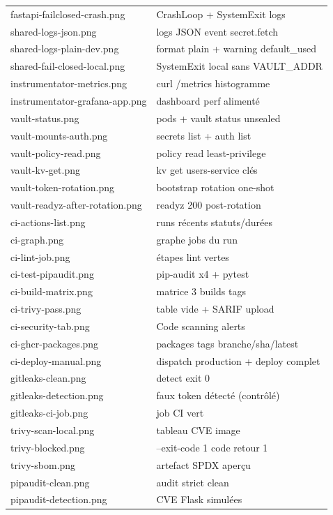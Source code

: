 \documentclass[12pt,a4paper]{article}
\begin{document}
{\begin{longtable}{@{}p{5.6cm}p{9.4cm}@{}}
fastapi-failclosed-crash.png & CrashLoop + SystemExit logs \\
shared-logs-json.png & logs JSON event secret.fetch \\
shared-logs-plain-dev.png & format plain + warning default\_used \\
shared-fail-closed-local.png & SystemExit local sans VAULT\_ADDR \\
instrumentator-metrics.png & curl /metrics histogramme \\
instrumentator-grafana-app.png & dashboard perf alimenté \\
vault-status.png & pods + vault status unsealed \\
vault-mounts-auth.png & secrets list + auth list \\
vault-policy-read.png & policy read least-privilege \\
vault-kv-get.png & kv get users-service clés \\
vault-token-rotation.png & bootstrap rotation one-shot \\
vault-readyz-after-rotation.png & readyz 200 post-rotation \\
ci-actions-list.png & runs récents statuts/durées \\
ci-graph.png & graphe jobs du run \\
ci-lint-job.png & étapes lint vertes \\
ci-test-pipaudit.png & pip-audit x4 + pytest \\
ci-build-matrix.png & matrice 3 builds tags \\
ci-trivy-pass.png & table vide + SARIF upload \\
ci-security-tab.png & Code scanning alerts \\
ci-ghcr-packages.png & packages tags branche/sha/latest \\
ci-deploy-manual.png & dispatch production + deploy complet \\
gitleaks-clean.png & detect exit 0 \\
gitleaks-detection.png & faux token détecté (contrôlé) \\
gitleaks-ci-job.png & job CI vert \\
trivy-scan-local.png & tableau CVE image \\
trivy-blocked.png & --exit-code 1 code retour 1 \\
trivy-sbom.png & artefact SPDX aperçu \\
pipaudit-clean.png & audit strict clean \\
pipaudit-detection.png & CVE Flask simulées \\

\end{longtable}}
\end{document}
